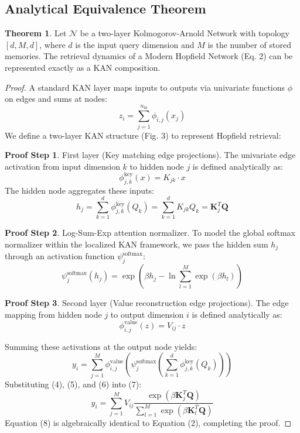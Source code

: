 \documentclass[10pt,journal,compsoc]{IEEEtran}
\theoremstyle{definition}
\newtheorem{theorem}{Theorem}
\newtheorem{proof_part}{Proof Step}
\begin{document}
\subsection{Analytical Equivalence Theorem}
\begin{theorem}
Let $\mathcal{N}$ be a two-layer Kolmogorov-Arnold Network with topology $[d, M, d]$, where $d$ is the input query dimension and $M$ is the number of stored memories. The retrieval dynamics of a Modern Hopfield Network (Eq. 2) can be represented exactly as a KAN composition.
\end{theorem}

\begin{proof}
A standard KAN layer maps inputs to outputs via univariate functions $\phi$ on edges and sums at nodes:
\begin{equation}
z_i = \sum_{j=1}^{n_{\text{in}}} \phi_{i,j}(x_j)
\end{equation}
We define a two-layer KAN structure (Fig. 3) to represent Hopfield retrieval:
\begin{proof_part}
First layer (Key matching edge projections). The univariate edge activation from input dimension $k$ to hidden node $j$ is defined analytically as:
\begin{equation}
\phi^{\text{key}}_{j,k}(x) = K_{jk} \cdot x
\end{equation}
The hidden node aggregates these inputs:
\begin{equation}
h_j = \sum_{k=1}^d \phi^{\text{key}}_{j,k}(Q_k) = \sum_{k=1}^d K_{jk} Q_k = \mathbf{K}_j^T \mathbf{Q}
\end{equation}
\end{proof_part}
\begin{proof_part}
Log-Sum-Exp attention normalizer. To model the global softmax normalizer within the localized KAN framework, we pass the hidden sum $h_j$ through an activation function $\psi^{\text{softmax}}_j$:
\begin{equation}
\psi^{\text{softmax}}_j(h_j) = \exp \left( \beta h_j - \ln \sum_{l=1}^M \exp(\beta h_l) \right)
\end{equation}
\end{proof_part}
\begin{proof_part}
Second layer (Value reconstruction edge projections). The edge mapping from hidden node $j$ to output dimension $i$ is defined analytically as:
\begin{equation}
\phi^{\text{value}}_{i,j}(z) = V_{ij} \cdot z
\end{equation}
\end{proof_part}
Summing these activations at the output node yields:
\begin{equation}
y_i = \sum_{j=1}^{M} \phi^{\text{value}}_{i,j} \left( \psi^{\text{softmax}}_j \left( \sum_{k=1}^d \phi^{\text{key}}_{j,k}(Q_k) \right) \right)
\end{equation}
Substituting (4), (5), and (6) into (7):
\begin{equation}
y_i = \sum_{j=1}^{M} V_{ij} \frac{\exp(\beta \mathbf{K}_j^T \mathbf{Q})}{\sum_{l=1}^M \exp(\beta \mathbf{K}_l^T \mathbf{Q})}
\end{equation}
Equation (8) is algebraically identical to Equation (2), completing the proof.
\end{proof}
\end{document}
